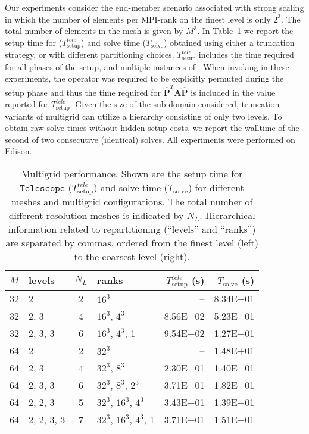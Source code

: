 \documentclass[]{siamart0216}
\newcommand{\dmat}[1]{\mathbf{#1}}
\begin{document}
Our experiments consider the end-member scenario associated with strong scaling in which the 
number of elements per MPI-rank on the finest level is only $2^3$. The total number of elements in the mesh is 
given by $M^3$.
In Table~\ref{tab:telescopeMG} we report the setup time for  ($T^{tele}_\text{setup}$) and 
solve time ($T_\text{solve}$) obtained using either a truncation strategy, 
or  with different partitioning choices.
$T^{tele}_\text{setup}$ includes the time required for all phases of the setup, and multiple instances of .
When invoking  in these experiments, the 
operator was required to be explicitly permuted during the setup phase and thus the time required for $\hat{\dmat P}^T \dmat A \hat{\dmat P}$ 
is included in the value reported for $T^{tele}_\text{setup}$. 
Given the size of the sub-domain considered, truncation variants of multigrid can utilize a hierarchy consisting of only two levels.
To obtain raw solve times without hidden setup costs, 
we report the walltime of the second of two consecutive (identical) solves.
All experiments were performed on Edison. 
\begin{table}[h!]
\centering
\caption{Multigrid performance. 
Shown are the setup time for $\mathtt{Telescope}$ ($T^{tele}_\mathrm{setup}$) and solve time ($T_\mathrm{solve}$) for
different meshes and multigrid configurations. 
The total number of different resolution meshes is indicated by $N_L$.
Hierarchical information related to repartitioning (``levels'' and ``ranks'') are separated by commas, 
ordered from the finest level (left) to the coarsest level (right).
}
\begin{tabular}{l l c l r r}
\toprule
$M$    &levels   &$N_L$  &ranks  &$T^{tele}_\text{setup}$ (s) &$T_\text{solve}$ (s)\\
\toprule
32 &2          &2 &$16^3$                       &--   &8.34E$-$01 \\ 32 &2, 3      &4 &$16^3$, $4^3$           &8.56E$-$02   &5.23E$-$01 \\ 32 &2, 3, 3  &6 &$16^3$, $4^3$, 1       &9.54E$-$02   &1.27E$-$01 \\ \midrule
64 &2          &2  &$32^3$                    &--                   &1.48E$+$01 \\ 64 &2, 3      &4  &$32^3$, $8^3$            &2.30E$-$01                       &1.40E$-$01 \\ 64 &2, 3, 3  &6  &$32^3$, $8^3$, $2^3$        &3.71E$-$01   &1.82E$-$01 \\ 64 &2, 2, 3  &5  &$32^3$, $16^3$, $4^3$    &3.43E$-$01   &1.39E$-$01 \\ 64 &2, 2, 3, 3 &7 &$32^3$, $16^3$, $4^3$, 1 &3.71E$-$01 &1.51E$-$01 \\ \bottomrule
\end{tabular}
\label{tab:telescopeMG}
\end{table}
\end{document}
